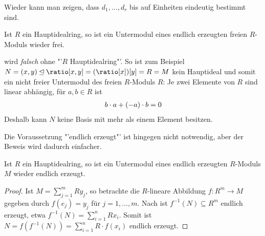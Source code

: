 \begin{*example}
\begin{center}
	\end{center}
\end{*example}

\begin{remark}
	Wieder kann man zeigen, dass $d_1,...,d_r$ bis auf Einheiten eindeutig bestimmt sind.
\end{remark}

\begin{conclusion}
	Ist $R$ ein Hauptidealring, so ist ein Untermodul eines endlich erzeugten freien $R$-Moduls wieder frei.
\end{conclusion}

\begin{remark}
	 wird \emph{falsch} ohne "'$R$ Hauptidealring"'. So ist zum Beispiel $N=(x,y)\unlhd\ratio[x,y]=(\ratio[x])[y]=R=M$ kein Hauptideal und somit ein nicht freier Untermodul des freien $R$-Moduls $R$: Je zwei Elemente von $R$ sind linear abhängig, für $a,b\in R$ ist
	\begin{align}
		b\cdot a+(-a)\cdot b=0\notag
	\end{align}
	Deshalb kann $N$ keine Basis mit mehr als einem Element besitzen.
	
	Die Voraussetzung "'endlich erzeugt"' ist hingegen nicht notwendig, aber der Beweis wird dadurch einfacher. 
\end{remark}

\begin{conclusion}
	Ist $R$ ein Hauptidealring, so ist ein Untermodul eines endlich erzeugten $R$-Moduls $M$ wieder endlich erzeugt.
\end{conclusion}
\begin{proof}
	Ist $M=\sum_{j=1}^m Ry_j$, so betrachte die $R$-lineare Abbildung $f:R^m\to M$ gegeben durch $f(e_j)=y_j$ für $j=1,...,m$. Nach  ist $f^{-1}(N)\subseteq R^m$ endlich erzeugt, etwa $f^{-1}(N)=\sum_{i=1}^n Rx_i$. Somit ist $N=f(f^{-1}(N))=\sum_{i=1}^n R\cdot f(x_i)$ endlich erzeugt.
\end{proof}

